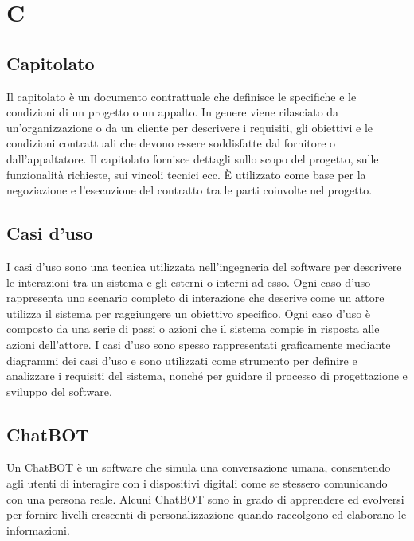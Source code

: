 \section{C}


\vspace{2em}
\subsection*{Capitolato}
\par Il capitolato è un documento contrattuale che definisce le specifiche e le condizioni di un progetto o un appalto. In genere viene rilasciato da un'organizzazione o da un cliente per descrivere i requisiti, gli obiettivi e le condizioni contrattuali che devono essere soddisfatte dal fornitore o dall'appaltatore. Il capitolato fornisce dettagli sullo scopo del progetto, sulle funzionalità richieste, sui vincoli tecnici ecc. È utilizzato come base per la negoziazione e l'esecuzione del contratto tra le parti coinvolte nel progetto.

\vspace{2em}
\subsection*{Casi d'uso}
\par I casi d'uso sono una tecnica utilizzata nell'ingegneria del software per descrivere le interazioni tra un sistema e gli  esterni o interni ad esso. Ogni caso d'uso rappresenta uno scenario completo di interazione che descrive come un attore utilizza il sistema per raggiungere un obiettivo specifico. Ogni caso d'uso è composto da una serie di passi o azioni che il sistema compie in risposta alle azioni dell'attore. I casi d'uso sono spesso rappresentati graficamente mediante diagrammi dei casi d'uso e sono utilizzati come strumento per definire e analizzare i requisiti del sistema, nonché per guidare il processo di progettazione e sviluppo del software.

\vspace{2em}
\subsection*{ChatBOT}
\par Un ChatBOT è un software che simula una conversazione umana, consentendo agli utenti di interagire con i dispositivi digitali come se stessero comunicando con una persona reale. Alcuni ChatBOT sono in grado di apprendere ed evolversi per fornire livelli crescenti di personalizzazione quando raccolgono ed elaborano le informazioni.

